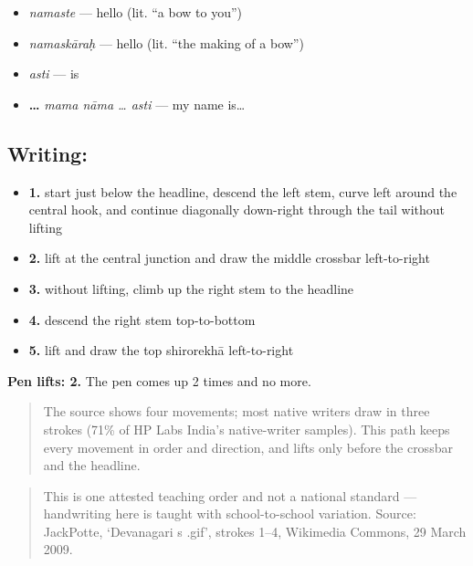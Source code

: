 \begin{itemize}
\raggedright
  \item \textbf{} \emph{namaste} — hello (lit. \textquotedblleft{}a bow to you\textquotedblright{})
  \item \textbf{} \emph{namaskāraḥ} — hello (lit. \textquotedblleft{}the making of a bow\textquotedblright{})
  \item \textbf{} \emph{asti} — is
  \item \textbf{  … } \emph{mama nāma … asti} — my name is…
\end{itemize}

\subsection*{Writing: }

\begin{itemize}
\raggedright
  \item \textbf{1.} start just below the headline, descend the left stem, curve left around the central hook, and continue diagonally down-right through the tail without lifting
  \item \textbf{2.} lift at the central junction and draw the middle crossbar left-to-right
  \item \textbf{3.} without lifting, climb up the right stem to the headline
  \item \textbf{4.} descend the right stem top-to-bottom
  \item \textbf{5.} lift and draw the top shirorekhā left-to-right
\end{itemize}

\textbf{Pen lifts: 2.} The pen comes up 2 times and no more.

\begin{quote}
The source shows four movements; most native writers draw  in three strokes (71\% of HP Labs India's native-writer samples). This path keeps every movement in order and direction, and lifts only before the crossbar and the headline.
\end{quote}

\begin{quote}
This is one attested teaching order and not a national standard — handwriting here is taught with school-to-school variation. Source: JackPotte, ‘Devanagari s .gif’, strokes 1–4, Wikimedia Commons, 29 March 2009.
\end{quote}

